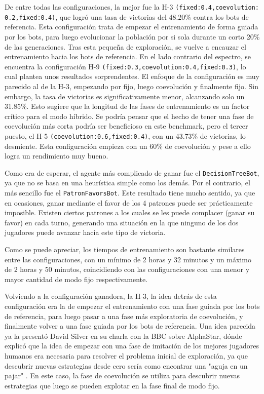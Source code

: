 De entre todas las configuraciones, la mejor fue la H-3 \texttt{(fixed:0.4,coevolution: 0.2,fixed:0.4)}, que logró una tasa de victorias del 48.20\% contra los bots de referencia. Esta configuración trata de empezar el entrenamiento de forma guiada por los bots, para luego evolucionar la población por si sola durante un corto 20\% de las generaciones. Tras esta pequeña de exploración, se vuelve a encauzar el entrenamiento hacia los bots de referencia. En el lado contrario del espectro, se encuentra la configuración H-9 \texttt{(fixed:0.3,coevolution:0.4,fixed:0.3)}, lo cual plantea unos resultados sorprendentes. El enfoque de la configuración es muy parecido al de la H-3, empezando por fijo, luego coevolución y finalmente fijo. Sin embargo, la tasa de victorias es significativamente menor, alcanzando solo un 31.85\%. Esto sugiere que la longitud de las fases de entrenamiento es un factor crítico para el modo híbrido. Se podría pensar que el hecho de tener una fase de coevolución más corta podría ser beneficioso en este benchmark, pero el tercer puesto, el H-5 \texttt{(coevolution:0.6,fixed:0.4)}, con un 43.73\% de victorias, lo desmiente. Esta configuración empieza con un 60\% de coevolución y pese a ello logra un rendimiento muy bueno.

Como era de esperar, el agente más complicado de ganar fue el \texttt{DecisionTreeBot}, ya que no se basa en una heurística simple como los demás. Por el contrario, el más sencillo fue el \texttt{PatronFavorsBot}. Este resultado tiene mucho sentido, ya que en ocasiones, ganar mediante el favor de los 4 patrones puede ser prácticamente imposible. Existen ciertos patrones a los cuales se les puede complacer (ganar su favor) en cada turno, generando una situación en la que ninguno de los dos jugadores puede avanzar hacia este tipo de victoria.

Como se puede apreciar, los tiempos de entrenamiento son bastante similares entre las configuraciones, con un mínimo de 2 horas y 32 minutos y un máximo de 2 horas y 50 minutos, coincidiendo con las configuraciones con una menor y mayor cantidad de modo fijo respectivamente.

Volviendo a la configuración ganadora, la H-3, la idea detrás de esta configuración era la de empezar el entrenamiento con una fase guiada por los bots de referencia, para luego pasar a una fase más exploratoria de coevolución, y finalmente volver a una fase guiada por los bots de referencia. Una idea parecida ya la presentó David Silver en su charla con la BBC sobre AlphaStar, dónde explicó que la idea de empezar con una fase de imitación de los mejores jugadores humanos era necesaria para resolver el problema inicial de exploración, ya que descubrir nuevas estrategias desde cero sería como encontrar una "aguja en un pajar" \cite{leo_kelion_deepmind_2019}. En este caso, la fase de coevolución se utiliza para descubrir nuevas estrategias que luego se pueden explotar en la fase final de modo fijo.

